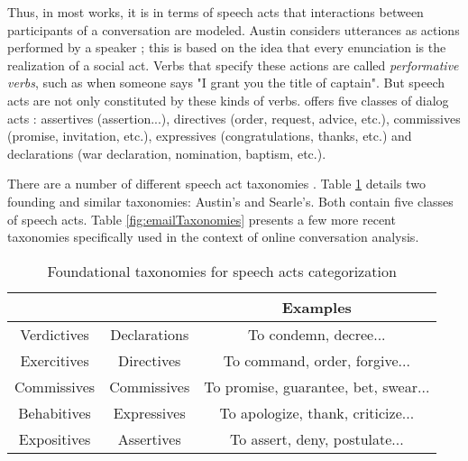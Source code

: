 \documentclass[11pt]{article}
\begin{document}
Thus, in most works, it is in terms of speech acts that interactions between participants of a conversation are modeled. Austin considers utterances as actions performed by a speaker ; this is based on the idea that every enunciation is the realization of a social act. Verbs that specify these actions are called \textit{performative verbs}, such as when someone says "I grant you the title of captain". But speech acts are not only constituted by these kinds of verbs. \cite{searle1976taxonomy} offers five classes of dialog acts : assertives (assertion...), directives (order, request, advice, etc.), commissives (promise, invitation, etc.), expressives (congratulations, thanks, etc.) and declarations (war declaration, nomination, baptism, etc.).

There are a number of different speech act taxonomies \cite{traum200020}. Table \ref{fig:fundamentalTaxonomies} details two founding and similar taxonomies: Austin's and Searle's. Both contain five classes of speech acts. Table \ref{fig:emailTaxonomies} presents a few more recent taxonomies specifically used in the context of online conversation analysis.

\begin{table}
	\begin{tabularx}{\textwidth}{c c c}
		\toprule
		\cite{austin1975things} & \cite{searle1976taxonomy} & Examples \\
		\midrule
		Verdictives & Declarations & To condemn, decree... \\
		Exercitives & Directives & To command, order, forgive... \\
		Commissives & Commissives & To promise, guarantee, bet, swear... \\
		Behabitives & Expressives & To apologize, thank, criticize... \\
		Expositives & Assertives & To assert, deny, postulate... \\
		\bottomrule
	\end{tabularx}
	\caption{Foundational taxonomies for speech acts categorization}
	\label{fig:fundamentalTaxonomies}
\end{table}
\end{document}
